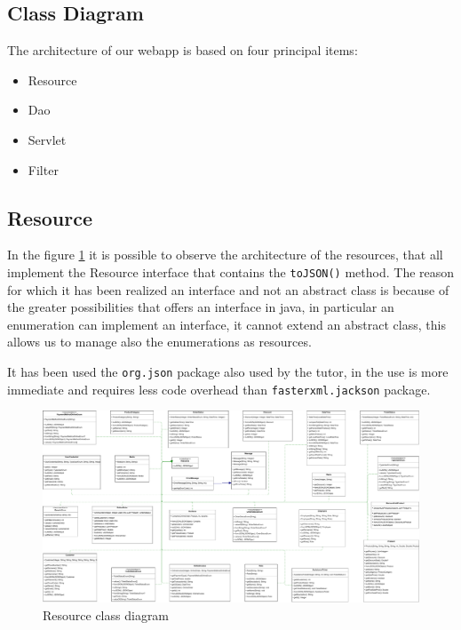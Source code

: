 \subsection{Class Diagram}

The architecture of our webapp is based on four principal items:
\begin{itemize}
    \item Resource
    \item Dao
    \item Servlet
    \item Filter
\end{itemize}

\subsection*{Resource}

In the figure \ref{fig:ResouceClassDiagram} it is possible to observe the 
architecture of the resources, that all implement the Resource interface 
that contains the \texttt{toJSON()} method. 
The reason for which it has been realized an interface and not an abstract 
class is because of the greater possibilities that offers an interface in 
java, in particular an enumeration can implement an interface, it cannot 
extend an abstract class, this allows us to manage also the enumerations 
as resources.

It has been used the \texttt{org.json} package also used by the tutor, in the 
use is more  immediate and requires less code overhead than 
\texttt{fasterxml.jackson} package.


\begin{figure}[H]
    \includegraphics[width=\textwidth,height=\textheight,keepaspectratio]{Schemas/resources.drawio.pdf}
    \caption{Resource class diagram}
    \label{fig:ResouceClassDiagram}
\end{figure}

